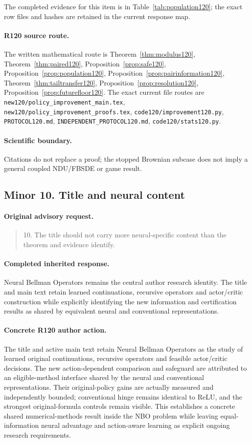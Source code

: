 The completed evidence for this item is in Table~\ref{tab:population120}; the exact row files and hashes are retained in the current response map.
\paragraph{R120 source route.}
The written mathematical route is Theorem~\ref{thm:modulus120}, Theorem~\ref{thm:paired120}, Proposition~\ref{prop:safe120}, Proposition~\ref{prop:population120}, Proposition~\ref{prop:pairinformation120}, Theorem~\ref{thm:tailtransfer120}, Proposition~\ref{prop:resolution120}, Proposition~\ref{prop:futurefloor120}. The exact current file routes are \nolinkurl{new120/policy_improvement_main.tex}, \nolinkurl{new120/policy_improvement_proofs.tex}, \nolinkurl{code120/improvement120.py}, \nolinkurl{PROTOCOL120.md}, \nolinkurl{INDEPENDENT_PROTOCOL120.md}, \nolinkurl{code120/stats120.py}.
\paragraph{Scientific boundary.}
Citations do not replace a proof; the stopped Brownian subcase does not imply a general coupled NDU/FBSDE or game result.

\subsection{Minor 10. Title and neural content}
\label{response120:minor-10}
\paragraph{Original advisory request.}
\begin{quote}
10. The title should not carry more neural-specific content than the theorem and evidence identify.
\end{quote}
\paragraph{Completed inherited response.}
Neural Bellman Operators remains the central author research identity. The title and main text retain learned continuations, recursive operators and actor/critic construction while explicitly identifying the new information and certification results as shared by equivalent neural and conventional representations.
\paragraph{Concrete R120 author action.}
The title and active main text retain Neural Bellman Operators as the study of learned original continuations, recursive operators and feasible actor/critic decisions. The new action-dependent comparison and safeguard are attributed to an eligible-method interface shared by the neural and conventional representations. Their original-policy gains are actually measured and independently bounded; conventional hinge remains identical to ReLU, and the strongest original-formula controls remain visible. This establishes a concrete shared numerical-methods result inside the NBO problem while leaving equal-information neural advantage and action-aware learning as explicit ongoing research requirements.

